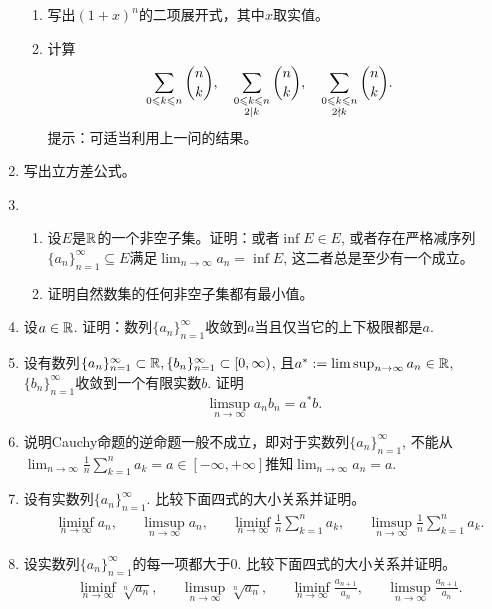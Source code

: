 \begin{enumerate}
\begin{enumerate}
        \item 写出$(1+x)^n$的二项展开式，其中$x$取实值。
        \item 计算\begin{align*}
                &\sum_{0\leqslant k\leqslant n} \binom{n}{k},&&\sum_{\begin{subarray}{c} 0\leqslant k\leqslant n\\2\mid k\end{subarray}} \binom{n}{k},&&\sum_{\begin{subarray}{c}0\leqslant k\leqslant n\\2\nmid k\end{subarray}} \binom{n}{k}.
            \end{align*}提示：可适当利用上一问的结果。
    \end{enumerate}
    \item 写出立方差公式。
    \item \begin{enumerate}
        \item 设$E$是$\mathbb{R}$的一个非空子集。证明：或者$\inf E\in E$, 或者存在严格减序列$\{a_n\}_{n=1}^\infty\subseteq E$满足$\lim_{n\to\infty}a_n=\inf E$, 这二者总是至少有一个成立。
        \item 证明自然数集的任何非空子集都有最小值。
    \end{enumerate}
    \item 设$a\in \mathbb{R}$. 证明：数列$\{a_n\}_{n=1}^\infty$收敛到$a$当且仅当它的上下极限都是$a$.
    \item 设有数列$\{a_n\}_{n=1}^\infty\subset \mathbb{R},\{b_n\}_{n=1}^\infty\subset [0,\infty)$, 且$a^*:=\limsup_{n\to \infty}a_n\in \mathbb{R}$, $\{b_n\}_{n=1}^\infty$收敛到一个有限实数$b$. 证明\begin{equation*}
        \limsup_{n\to\infty} a_nb_n=a^*b.
    \end{equation*}
    \item 说明Cauchy命题的逆命题一般不成立，即对于实数列$\{a_n\}_{n=1}^\infty$, 不能从$\lim_{n\to\infty}\frac{1}{n}\sum_{k=1}^{n}a_k=a\in [-\infty,+\infty]$推知$\lim_{n\to\infty}a_n=a$.
    \item 设有实数列$\{a_n\}_{n=1}^\infty$. 比较下面四式的大小关系并证明。\begin{align*}
        &\liminf_{n\to\infty}a_n,
        &&\limsup_{n\to\infty}a_n,
        &&\liminf_{n\to\infty}\frac{1}{n}\sum_{k=1}^{n}a_k,
        &&\limsup_{n\to\infty}\frac{1}{n}\sum_{k=1}^{n}a_k.
    \end{align*}
    \item 设实数列$\{a_n\}_{n=1}^{\infty}$的每一项都大于0. 比较下面四式的大小关系并证明。\begin{align*}
        &\liminf_{n\to\infty}\sqrt[n]{a_n},&&\limsup_{n\to\infty}\sqrt[n]{a_n},&&\liminf_{n\to\infty}\frac{a_{n+1}}{a_n},&&\limsup_{n\to\infty}\frac{a_{n+1}}{a_n}.
    \end{align*}
\end{enumerate}